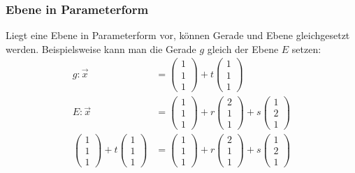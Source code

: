 \subsubsection{Ebene in Parameterform}
\begin{flushleft}
Liegt eine Ebene in Parameterform vor, können Gerade und Ebene gleichgesetzt werden.
Beispielsweise kann man die Gerade $g$ gleich der Ebene $E$ setzen:
\begin{align}
    g\colon\vec{x}&=\begin{pmatrix} 1 \\ 1 \\ 1 \end{pmatrix}+t\begin{pmatrix} 1 \\ 1 \\ 1 \end{pmatrix} \\
    E\colon\vec{x}&=\begin{pmatrix} 1 \\ 1 \\ 1 \end{pmatrix}+r\begin{pmatrix} 2 \\ 1 \\ 1 \end{pmatrix}+s\begin{pmatrix} 1 \\ 2 \\ 1 \end{pmatrix} \\
    \begin{pmatrix} 1 \\ 1 \\ 1 \end{pmatrix}+t\begin{pmatrix} 1 \\ 1 \\ 1 \end{pmatrix}&=\begin{pmatrix} 1 \\ 1 \\ 1 \end{pmatrix}+r\begin{pmatrix} 2 \\ 1 \\ 1 \end{pmatrix}+s\begin{pmatrix} 1 \\ 2 \\ 1 \end{pmatrix} \\

\end{align}
\end{flushleft}
